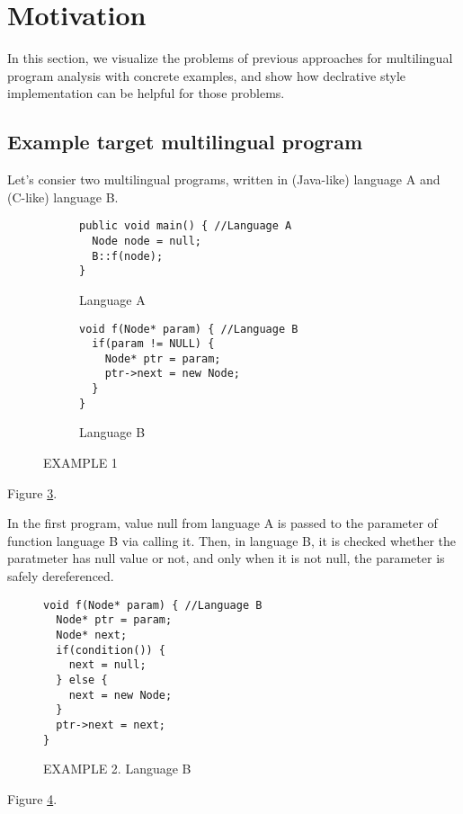 \section{Motivation}

In this section, we visualize the problems of previous approaches for
multilingual program analysis with concrete examples, and show how declrative
style implementation can be helpful for those problems.

\subsection{Example target multilingual program}

Let's consier two multilingual programs, written in (Java-like) language A
and (C-like) language B.
\begin{figure}[t]
  \centering
  \vspace{2mm}
  \begin{subfigure}[t]{0.5\textwidth}
    \begin{lstlisting}[style=java,xleftmargin=2.5em]
public void main() { //Language A
  Node node = null;
  B::f(node);
}
    \end{lstlisting}
    \vspace*{-.5em}
    \caption{Language A}
    \label{fig:exam1:langA}
  \end{subfigure}
  \begin{subfigure}[t]{0.5\textwidth}
    \begin{lstlisting}[style=cpp,firstnumber=5,xleftmargin=2.5em]
void f(Node* param) { //Language B
  if(param != NULL) {
    Node* ptr = param;
    ptr->next = new Node;
  }
}
    \end{lstlisting}
    \vspace*{-.5em}
    \caption{Language B}
    \label{fig:exam1:langB}
  \end{subfigure}
  \vspace*{-.5em}
  \caption{EXAMPLE 1}
  \label{fig:exam1}
\end{figure}
Figure \ref{fig:exam1}.

In the first program, value null from language A is passed to the parameter of
function language B via calling it. Then, in language B, it is checked whether
the paratmeter has null value or not, and only when it is not null, the
parameter is safely dereferenced.

\begin{figure}[t]
  \centering
  \vspace{2mm}
  \begin{lstlisting}[style=cpp,firstnumber=5,xleftmargin=2.5em]
void f(Node* param) { //Language B
  Node* ptr = param;
  Node* next;
  if(condition()) {
    next = null;
  } else {
    next = new Node;
  }
  ptr->next = next;
}
  \end{lstlisting}
  \vspace*{-.5em}
  \caption{EXAMPLE 2. Language B}
  \label{fig:exam2}
\end{figure}
Figure \ref{fig:exam2}.

